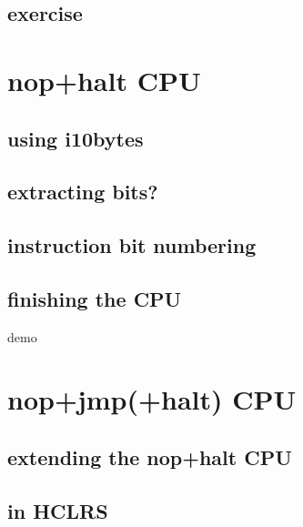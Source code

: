 \subsection{exercise}


\section{nop+halt CPU}





\subsection{using i10bytes}


\subsection{extracting bits?}



\subsection{instruction bit numbering}


\subsection{finishing the CPU}


\begin{frame}{demo}
\end{frame}

\section{nop+jmp(+halt) CPU}

\subsection{extending the nop+halt CPU}


\subsection{in HCLRS}


